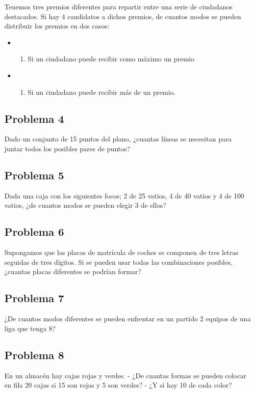 \documentclass[
]{article}
\providecommand{\tightlist}{%
  \setlength{\itemsep}{0pt}\setlength{\parskip}{0pt}}
\begin{document}
Tenemos tres premios diferentes para repartir entre una serie de
ciudadanos destacados. Si hay 4 candidatos a dichos premios, de cuantos
modos se pueden distribuir los premios en dos casos:

\begin{itemize}
\item
  \begin{enumerate}
  \def\labelenumi{\arabic{enumi}.}
  \tightlist
  \item
    Si un ciudadano puede recibir como máximo un premio
  \end{enumerate}
\item
  \begin{enumerate}
  \def\labelenumi{\arabic{enumi}.}
  \setcounter{enumi}{1}
  \tightlist
  \item
    Si un ciudadano puede recibir más de un premio.
  \end{enumerate}
\end{itemize}

\hypertarget{problema-4}{%
\subsection{Problema 4}\label{problema-4}}

Dado un conjunto de 15 puntos del plano, ¿cuantas líneas se necesitan
para juntar todos los posibles pares de puntos?

\hypertarget{problema-5-1}{%
\subsection{Problema 5}\label{problema-5-1}}

Dada una caja con los siguientes focos; 2 de 25 vatios, 4 de 40 vatios y
4 de 100 vatios, ¿de cuantos modos se pueden elegir 3 de ellos?

\hypertarget{problema-6-1}{%
\subsection{Problema 6}\label{problema-6-1}}

Supongamos que las placas de matrícula de coches se componen de tres
letras seguidas de tres dígitos. Si se pueden usar todas las
combinaciones posibles, ¿cuantas placas diferentes se podrían formar?

\hypertarget{problema-7-1}{%
\subsection{Problema 7}\label{problema-7-1}}

¿De cuantos modos diferentes se pueden enfrentar en un partido 2 equipos
de una liga que tenga 8?

\hypertarget{problema-8-1}{%
\subsection{Problema 8}\label{problema-8-1}}

En un almacén hay cajas rojas y verdes. - ¿De cuantas formas se pueden
colocar en fila 20 cajas si 15 son rojas y 5 son verdes? - ¿Y si hay 10
de cada color?
\end{document}

